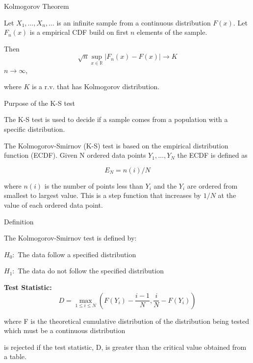 \documentclass{beamer}
\begin{document}
\begin{frame}
{\centerline{Kolmogorov Theorem}}

Let $X_1,\ldots,X_n,\ldots$ is an infinite sample from a continuous distribution $F(x)$. Let $F_n(x)$ is a empirical CDF build on first $n$ elements of the sample. 
\newline

Then
$$\sqrt{n} \sup\limits_{x\in \mathbb{R}} \left| F_n(x) - F(x) \right| \to K$$  $n \to \infty$,


where  $K$ is a r.v. that has Kolmogorov distribution.

\end{frame}

\begin{frame}
{\centerline{Purpose of the K-S test}}
The K-S test is used to decide if a sample comes from a population with a specific distribution.


The Kolmogorov-Smirnov (K-S) test is based on the empirical distribution function (ECDF). Given N ordered data points $Y_1,\ldots, Y_N$ the ECDF is defined as

$$E_N = n(i)/N$$

where $n(i)$ is the number of points less than $Y_i$ and the $Y_i$ are ordered from smallest to largest value. This is a step function that increases by $1/N$ at the value of each ordered data point.

\end{frame}



\begin{frame}
{\centerline{Definition}}
The Kolmogorov-Smirnov test is defined by:
\newline

\textbf{$H_0:$} The data follow a specified distribution
\newline

\textbf{$H_1:$} The data do not follow the specified distribution
\newline

\textbf{Test Statistic:}
$$D = \max_{1 \leq i \leq N} (F(Y_i) - \frac{i-1}{N}, \frac{i}{N} - F(Y_i))$$

where F is the theoretical cumulative distribution of the distribution being tested which must be a continuous distribution
\newline

is rejected if the test statistic, D, is greater than the critical value obtained from a table.

\end{frame}
\end{document}
